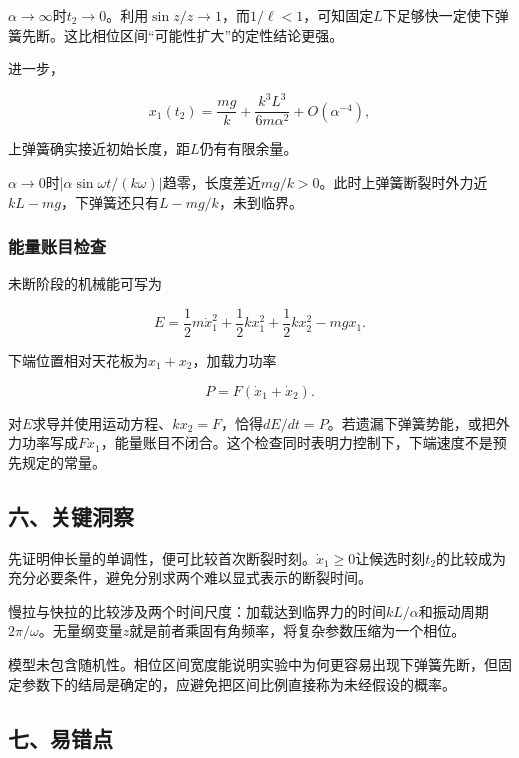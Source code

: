\documentclass[12pt,a4paper,fontset=fandol]{ctexart}
\begin{document}
\(\alpha\to\infty\)时\(t_2\to0\)。利用\(\sin z/z\to1\)，而\(1/\ell<1\)，可知固定\(L\)下足够快一定使下弹簧先断。这比相位区间``可能性扩大''的定性结论更强。

进一步，

\[
x_1(t_2)=\frac{mg}k+\frac{k^3L^3}{6m\alpha^2}
+O(\alpha^{-4}),
\]

上弹簧确实接近初始长度，距\(L\)仍有有限余量。

\(\alpha\to0\)时\(|\alpha\sin\omega t/(k\omega)|\)趋零，长度差近\(mg/k>0\)。此时上弹簧断裂时外力近\(kL-mg\)，下弹簧还只有\(L-mg/k\)，未到临界。

\par\noindent\begin{minipage}{\linewidth}
\subsubsection{能量账目检查}\label{ux80fdux91cfux8d26ux76eeux68c0ux67e5}

未断阶段的机械能可写为

\[
E=\frac12m\dot x_1^2
+\frac12kx_1^2+\frac12kx_2^2-mgx_1.
\]

下端位置相对天花板为\(x_1+x_2\)，加载力功率

\[
P=F(\dot x_1+\dot x_2).
\]

对\(E\)求导并使用运动方程、\(kx_2=F\)，恰得\(dE/dt=P\)。若遗漏下弹簧势能，或把外力功率写成\(F\dot x_1\)，能量账目不闭合。这个检查同时表明力控制下，下端速度不是预先规定的常量。

\end{minipage}\par
\subsection{六、关键洞察}\label{ux516dux5173ux952eux6d1eux5bdf-4}

先证明伸长量的单调性，便可比较首次断裂时刻。\(\dot x_1\geq0\)让候选时刻\(t_2\)的比较成为充分必要条件，避免分别求两个难以显式表示的断裂时间。

慢拉与快拉的比较涉及两个时间尺度：加载达到临界力的时间\(kL/\alpha\)和振动周期\(2\pi/\omega\)。无量纲变量\(z\)就是前者乘固有角频率，将复杂参数压缩为一个相位。

模型未包含随机性。相位区间宽度能说明实验中为何更容易出现下弹簧先断，但固定参数下的结局是确定的，应避免把区间比例直接称为未经假设的概率。

\subsection{七、易错点}\label{ux4e03ux6613ux9519ux70b9-4}
\end{document}
